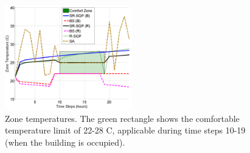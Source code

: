 \begin{figure}[t]
\centering
\includegraphics[width=0.49\textwidth]{figures/ZoneTemp_all_scissored}
\vspace{-20pt}
\caption{\small{Zone temperatures. The green rectangle shows the comfortable temperature limit of 22-28 C, applicable during time steps 10-19 (when the building is occupied).}}
\label{fig:ZoneTemp}
\vspace{-10pt}
\end{figure}






